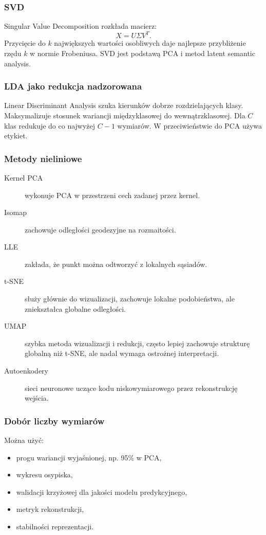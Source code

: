 \subsubsection{SVD}

Singular Value Decomposition rozkłada macierz:
\[
X=U\Sigma V^T.
\]
Przycięcie do $k$ największych wartości osobliwych daje najlepsze przybliżenie rzędu $k$ w normie Frobeniusa. SVD jest podstawą PCA i metod latent semantic analysis.

\subsubsection{LDA jako redukcja nadzorowana}

Linear Discriminant Analysis szuka kierunków dobrze rozdzielających klasy. Maksymalizuje stosunek wariancji międzyklasowej do wewnątrzklasowej. Dla $C$ klas redukuje do co najwyżej $C-1$ wymiarów. W przeciwieństwie do PCA używa etykiet.

\subsubsection{Metody nieliniowe}

\begin{description}
  \item[Kernel PCA] wykonuje PCA w przestrzeni cech zadanej przez kernel.
  \item[Isomap] zachowuje odległości geodezyjne na rozmaitości.
  \item[LLE] zakłada, że punkt można odtworzyć z lokalnych sąsiadów.
  \item[t-SNE] służy głównie do wizualizacji, zachowuje lokalne podobieństwa, ale zniekształca globalne odległości.
  \item[UMAP] szybka metoda wizualizacji i redukcji, często lepiej zachowuje strukturę globalną niż t-SNE, ale nadal wymaga ostrożnej interpretacji.
  \item[Autoenkodery] sieci neuronowe uczące kodu niskowymiarowego przez rekonstrukcję wejścia.
\end{description}

\subsubsection{Dobór liczby wymiarów}

Można użyć:
\begin{itemize}
  \item progu wariancji wyjaśnionej, np. 95\% w PCA,
  \item wykresu osypiska,
  \item walidacji krzyżowej dla jakości modelu predykcyjnego,
  \item metryk rekonstrukcji,
  \item stabilności reprezentacji.
\end{itemize}

